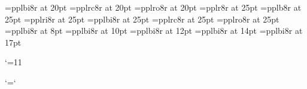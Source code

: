 \font\twtybi=pplbi8r at 20pt
\font\twtysc=pplrc8r at 20pt
\font\twtysl=pplro8r at 20pt
%
\font\twfvrm=pplr8r at 25pt
\font\twfvbf=pplb8r at 25pt
\font\twfvit=pplri8r at 25pt
\font\twfvbi=pplbi8r at 25pt
\font\twfvsc=pplrc8r at 25pt
\font\twfvsl=pplro8r at 25pt
%
\let\bigfont=\frtsc
\let\Bigfont=\svtsc
\let\BIgfont=\twtysc
\let\BIGfont=\twfvsc
%
%
\font\ppfftwelve=pplbi8r at 8pt
\font\ppffsixteen=pplbi8r at 10pt
\font\ppfftwenty=pplbi8r at 12pt
\font\ppfftwentyfour=pplbi8r at 14pt
\font\ppfftwentynine=pplbi8r at 17pt
%
\def\tinydyn{\let\ppff\tinyppff}  
\def\smalldyn{let\ppff\smallppff}
\def\normdyn{\let\ppff\normppff}
\def\meddyn{\let\ppff\medppff}

\def\f{{\ppff f}}
\def\ff{{\ppff ff}}
\def\fp{{\ppff fp}}
\def\fff{{\ppff fff}}
\def\ffff{{\ppff ffff}}
\def\mf{{\ppff mf}}
\def\p{{\ppff p}}
\def\pp{{\ppff pp}}
\def\ppp{{\ppff ppp}}
\def\pppp{{\ppff pppp}}

\edef\catcodeat{\the\catcode`\@}\catcode`\@=11
%
\def\sF{{\ppff s\p@kern f}}
\def\sfz{{\ppff s\p@kern f\f@kern z}}
\def\sfzp{{\ppff s\p@kern f\f@kern z\p@kern p}}

\def\mp@{{\ppff mp}}
\let\mezzopiano\mp@
\catcode`\@=\catcodeat

\def\smalltype{%
  \let\rm\eightrm
  \let\bf\eightbf
  \let\it\eightit
  \let\bi\eightbi
  \let\sc\eightsc
  \let\sl\eightsl
  \rm}
\def\Smalltype{%
  \let\rm\ninerm
  \let\bf\ninebf
  \let\it\nineit
  \let\bi\ninebi
  \let\sc\ninesc
  \let\sl\ninesl
  \rm}
\def\normtype{%
  \let\rm\tenrm
  \let\bf\tenbf
  \let\it\tenit
  \let\bi\tenbi
  \let\sc\tensc
  \let\sl\tensl
  \rm}
\def\medtype{%
  \let\rm\twelverm
  \let\bf\twelvebf
  \let\it\twelveit
  \let\bi\twelvebi
  \let\sc\twelvesc
  \let\sl\twelvesl
  \rm}
\def\bigtype{%
  \let\rm\bigfont
  \let\bf\bigfont
  \let\it\bigfont
  \let\bi\bigfont
  \let\sc\bigfont
  \let\sl\bigfont
  \sc}
\def\Bigtype{%
  \let\rm\Bigfont
  \let\bf\Bigfont
  \let\it\Bigfont
  \let\bi\Bigfont
  \let\sc\Bigfont
  \let\sl\Bigfont
  \sc}
\def\BIgtype{%
  \let\rm\BIgfont
  \let\bf\BIgfont
  \let\it\BIgfont
  \let\bi\Bigfont
  \let\sc\Bigfont
  \let\sl\Bigfont
  \sc}
\def\BIGtype{%
  \let\rm\BIGfont
  \let\bf\BIGfont
  \let\it\BIGfont
  \let\bi\BIGfont
  \let\sc\BIGfont
  \let\sl\BIGfont
  \sc}
%


\normtype
\endinput
